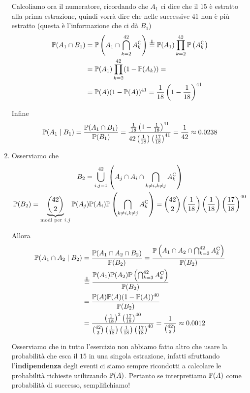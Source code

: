 \begin{enumerate}
Calcoliamo ora il numeratore, ricordando che $A_{1}$ ci dice che il $15$ è estratto alla prima estrazione, quindi vorrà dire che nelle successive $41$ non è più estratto (questa è l'informazione che ci dà $B_{1}$)\begin{align*}
\mathbb{P}(A_{1} \cap B_{1}) & =\mathbb{P}\left(A_{1} \cap \bigcap _{k=2}^{42} A_{k}^{\mathrm{C}}\right)\overset{\perp \!\!\! \perp }{=}\mathbb{P}(A_{1})\prod _{k=2}^{42}\mathbb{P}\left(A_{k}^{\mathrm{C}}\right)\\
 & =\mathbb{P}(A_{1})\prod _{k=2}^{42}(1-\mathbb{P}(A_{k})) =\\
 & =\mathbb{P}(A)(1-\mathbb{P}(A))^{41} =\frac{1}{18}\left(1-\frac{1}{18}\right)^{41}
\end{align*}

Infine
\begin{equation*}
\mathbb{P}(A_{1} \mid B_{1}) =\frac{\mathbb{P}(A_{1} \cap B_{1})}{\mathbb{P}(B_{1})} =\frac{\frac{1}{18}\left(1-\frac{1}{18}\right)^{41}}{42\left(\frac{1}{18}\right)\left(\frac{17}{18}\right)^{41}} =\frac{1}{42} \approx 0.0238
\end{equation*}
\item Osserviamo che
\begin{gather*}
B_{2} =\bigcup _{i,j=1}^{42}\left(A_{j} \cap A_{i} \cap \bigcap _{k\neq i,k\neq j} A_{k}\complementary\right)\\
\PP(B_{2}) =\underbrace{\binom{42}{2}}_{\text{modi per} \ i,j}\PP(A_{j})\PP(A_{i})\PP\left(\bigcap _{k\neq i,k\neq j} A_{k}\complementary\right) =\binom{42}{2}\left(\frac{1}{18}\right)\left(\frac{1}{18}\right)\left(\frac{17}{18}\right)^{40}
\end{gather*}

Allora
\begin{align*}
\mathbb{P}(A_{1} \cap A_{2} \mid B_{2}) & =\frac{\mathbb{P}(A_{1} \cap A_{2} \cap B_{2})}{\mathbb{P}(B_{2})} =\frac{\mathbb{P}\left(A_{1} \cap A_{2} \cap \bigcap _{k=3}^{42} A_{k}^{\mathrm{C}}\right)}{\mathbb{P}(B_{2})}\\
 & \overset{\perp \!\!\! \perp }{=}\frac{\mathbb{P}(A_{1})\mathbb{P}(A_{2})\mathbb{P}\left(\bigcap _{k=3}^{42} A_{k}^{\mathrm{C}}\right)}{\mathbb{P}(B_{2})}\\
 & =\frac{\mathbb{P}(A)\mathbb{P}(A)(1-\mathbb{P}(A))^{40}}{\mathbb{P}(B_{2})}\\
 & =\frac{\left(\frac{1}{18}\right)^{2}\left(\frac{17}{18}\right)^{40}}{\binom{42}{2}\left(\frac{1}{18}\right)\left(\frac{1}{18}\right)\left(\frac{17}{18}\right)^{40}} =\frac{1}{\binom{42}{2}} \approx 0.0012
\end{align*}

\begin{rem}
Osserviamo che in tutto l'esercizio non abbiamo fatto altro che usare la probabilità che esca il $15$ in una singola estrazione, infatti sfruttando l'\textbf{indipendenza} degli eventi ci siamo sempre ricondotti a calcolare le probabilità richieste utilizzando $\mathbb{P}(A)$. Pertanto se interpretiamo $\mathbb{P}(A)$ come probabilità di successo, semplifichiamo!
\end{rem}

\end{enumerate}

